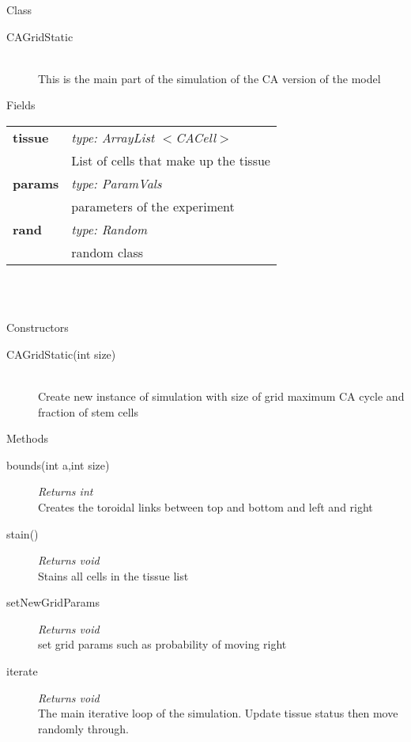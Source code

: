 \documentclass[11pt,a4paper]{article}
\newcommand \bt{\begin{tabular*}{0.99\textwidth}{p{0.25\textwidth}p{0.74\textwidth}}}
\newcommand \et{\end{tabular*}\\}
\newcommand{\hs}{\hspace{0.5cm}}
\newenvironment{di}
{\begin{flushright}
\begin{minipage}{0.95\textwidth}
\begin{description}
}
{\end{description}
\end{minipage}
\end{flushright}
}
\begin{document}
\noindent
\colorbox{classbg}{\parbox{1.0\textwidth}{\Large{Class}}}
\begin{di}
\item[\large{CAGridStatic}]\qquad\\
This is the main part of the simulation of the CA version of the model
\end{di}
\colorbox{fieldbg}{\parbox{1.0\textwidth}{\Large{Fields}}}\vspace{0.5cm}
\bt
\hs \textbf{tissue} & \emph{type: ArrayList $<$CACell$>$}\\
& \hs List of cells that make up the tissue\\
\hs \textbf{params} & \emph{type: ParamVals}\\
& \hs parameters of the experiment\\
\hs \textbf{rand} & \emph{type: Random}\\
& \hs random class\\
\et
\\\colorbox{conbg}{\parbox{1.0\textwidth}{\Large{Constructors}}}
\begin{di}
\item[CAGridStatic(int size)]\qquad\\
Create new instance of simulation with size of grid maximum CA cycle and fraction of stem cells
\end{di}
\colorbox{descriptbg}{\parbox{1.0\textwidth}{\Large{Methods}}}
\begin{di}
\item[bounds(int a,int size)]\emph{Returns int}\\
Creates the toroidal links between top and bottom and left and right\\
\item[stain()]\emph{Returns void}\\
Stains all cells in the tissue list\\
\item[setNewGridParams]\emph{Returns void}\\
set grid params such as probability of moving right\\
\item[iterate]\emph{Returns void}\\
The main iterative loop of the simulation. Update tissue status then move randomly through.\\
\end{di}
\end{document}
